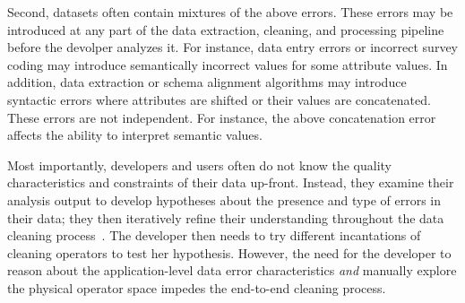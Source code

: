 Second, datasets often contain mixtures of the above errors.  These errors may be introduced at any part of the data extraction, cleaning, and processing pipeline before the devolper analyzes it.  For instance, data entry errors or incorrect survey coding may introduce semantically incorrect values for some attribute values.  In addition, data extraction or schema alignment algorithms may introduce syntactic errors where attributes are shifted or their values are concatenated.  These errors are not independent. For instance, the above concatenation error affects the ability to interpret semantic values.  

Most importantly, developers and users often do not know the quality characteristics and constraints of their data up-front.  Instead, they examine their analysis output to develop hypotheses about the presence and type of errors in their data; they then iteratively refine their understanding throughout the data cleaning process~\cite{krishnan2016hilda}.  The developer then needs to try different incantations of cleaning operators to test her hypothesis.   However, the need for the developer to reason about the application-level data error characteristics {\it and} manually explore the physical operator space impedes the end-to-end cleaning process.   


